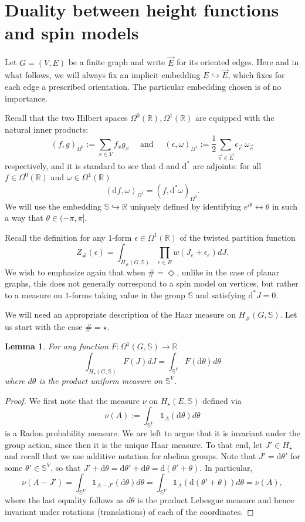 \documentclass[11pt, reqno]{amsart}
\newtheorem{lemma}[theorem]{Lemma}
\numberwithin{equation}{section}
\theoremstyle{definition}
\theoremstyle{remark}
\newcommand{\id}{\mathds{1}}
\newcommand{\RR}{\mathbb{R}}
\renewcommand{\d}{\mathrm{d}}
\newcommand{\J}{J}
\newcommand{\exact}{\star}
\newcommand{\coclosed}{\Diamond}
\newcommand{\Hcycle}{\ensuremath{H_{\star}}}
\begin{document}
\section{Duality between height functions and spin models} \label{ap:duality}
Let $G = (V, E)$ be a finite graph and write $\vec{E}$ for its oriented edges. Here and in what follows, we will always fix an implicit embedding $E \hookrightarrow \vec{E}$, 
which fixes for each edge a prescribed orientation. The particular embedding chosen is of no importance. 

Recall that the two Hilbert spaces $\Omega^0(\RR), \Omega^1(\RR)$ are equipped with the natural inner products:
\[
(f, g)_{\Omega^0} := \sum_{x \in V} f_x g_x \quad \text{ and } \quad 
	(\epsilon, \omega)_{\Omega^1} := \frac{1}{2}\sum_{\vec{e} \in \vec{E}} \epsilon_{\vec{e}} \:\omega_{\vec{e}}
\]
respectively, and it is standard to see that $\d$ and $\d^*$ are adjoints: for all $f \in \Omega^0(\RR)$ and $\omega \in \Omega^1(\RR)$
\[
	(\d f, \omega)_{\Omega^1} = (f, \d^* \omega)_{\Omega^0}.
\]
We will use the embedding $\mathbb{S} \hookrightarrow \RR$ uniquely defined by identifying $e^{i \theta} \leftrightarrow \theta$ 
in such a way that $\theta \in (-\pi, \pi]$.

Recall the definition for any $1$-form $\epsilon \in \Omega^1(\RR)$ of the twisted partition function
\[
	Z_{\#}(\epsilon) = \int_{H_{\#}(G, \mathbb{S})} \prod_{e \in E} w(\J_e + \epsilon_e)  d\J.
\]
We wish to emphasize again that when $\# = \coclosed$, unlike in the case of planar graphs, this does not generally correspond to a spin model on vertices, 
but rather to a measure on $1$-forms taking value in the group $\mathbb{S}$ and satisfying $\d^* \J = 0$. 


We will need an appropriate description of the Haar measure on $H_{\#}(G, \mathbb{S})$. 
Let us start with the case $\#  =  \exact$. 

\begin{lemma} \label{Lapp: Hcycle def}
	For any function $F: \Omega^1(G, \mathbb{S}) \to \RR$
	\[
		\int_{\Hcycle(G, \mathbb{S})} F(\J) d \J = \int_{\mathbb{S}^V} F(\d \theta) d \theta
	\]
	where $d\theta$ is the product uniform measure on $\mathbb{S}^V$. 
\end{lemma}

\begin{proof}
	We first note that the measure $\nu$ on $\Hcycle(E, \mathbb{S})$ defined via
	\[
		\nu(A) := \int_{\mathbb{S}^V} \id_{A}(\d \theta) d \theta
	\]
	is a Radon probability measure. We are left to argue that it is invariant under the group action, since then it is the unique Haar measure. 
	To that end, let $\J' \in \Hcycle$ and recall that we use additive notation for abelian groups. Note that $\J' = \d \theta'$ for some $\theta' \in \mathbb{S}^V$, so that $\J'+\d \theta= \d\theta' +\d \theta = \d(\theta' +\theta)$. 
	In particular, 
	\[
		\nu( A-J') = \int_{\mathbb{S}^V} \id_{A-J'}(\d \theta) d \theta = \int_{\mathbb{S}^V} \id_{A}(\d (\theta'+ \theta)) d \theta = \nu(A),
	\]
	where the last equality follows as $d \theta$ is the product Lebesgue measure and hence invariant under rotations (translations) of each of the coordinates. 
\end{proof}
\end{document}
